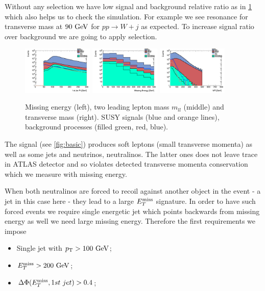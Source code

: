 \documentclass[tightenline,notitlepage,nofootinbib]{revtex4-1}
\begin{document}

Without any selection we have low signal and background relative ratio as in \cref{fig:nocuts} which also helps us to check the simulation. For example we see resonance for transverse mass at $90~\rm{GeV}$ for $pp \to W +j$ as expected. To increase signal ratio over background we are going to apply selection.
\clearpage
\begin{figure}[!ht]
  \centering
  \includegraphics[width=0.3\textwidth]{h_PtJets1st.png}
  \includegraphics[width=0.3\textwidth]{h_MET.png}
  \includegraphics[width=0.3\textwidth]{h_MT.png}
  \caption{Missing energy (left), two leading lepton mass $m_{ll}$ (middle) and transverse mass (right). SUSY signals (blue and orange lines), background processes (filled green, red, blue). }
  \label{fig:nocuts}
\end{figure}

The signal (see \cref{fig:basic}) produces soft leptons (small transverse momenta) as well as some jets and neutrinos, neutralinos. The latter ones does not leave trace in ATLAS detector and so violates detected transverse momenta conservation which we measure with missing energy.  

When both neutralinos are forced to recoil against another object in the event - a jet in this case here - they lead to a large $E_T^{\rm{miss}}$ signature. In order to have such forced events we require single energetic jet which points backwards from missing energy as well we need large missing energy. Therefore the first requirements we impose
\begin{itemize}
\item Single jet with $p_{\rm T}>100~\rm{GeV}$;
\item $E_T^{\rm{miss}}>200~\rm{GeV}$;
\item $\Delta \Phi(E_T^{\rm{miss}},1st ~jet)>0.4$;
\end{itemize}
\end{document}

